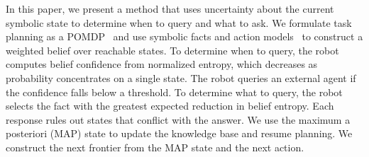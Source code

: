 
In this paper, we present a method that uses uncertainty about the current symbolic state to determine when to query and what to ask. We formulate task planning as a POMDP~\citep{kaelbling1998planning} and use symbolic facts and action models~\citep{davis1993knowledge,fikes1971strips} to construct a weighted belief over reachable states. To determine when to query, the robot computes belief confidence from normalized entropy, which decreases as probability concentrates on a single state. The robot queries an external agent if the confidence falls below a threshold. To determine what to query, the robot selects the fact with the greatest expected reduction in belief entropy. Each response rules out states that conflict with the answer. We use the maximum a posteriori (MAP) state to update the knowledge base and resume planning. We construct the next frontier from the MAP state and the next action.



